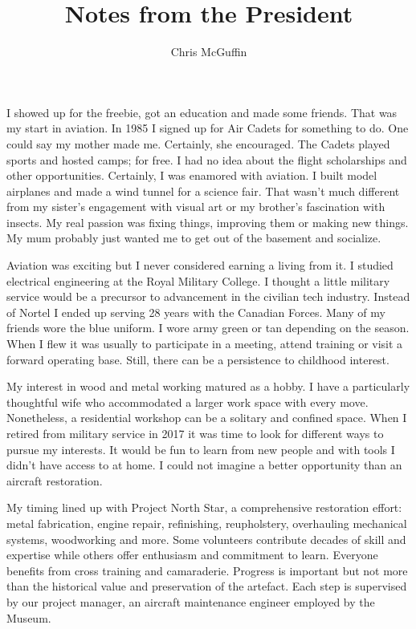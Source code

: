 
%


\title{Notes from the President}
\author{Chris McGuffin}

\maketitle

I showed up for the freebie, got an education and made some friends. That was my start in aviation. In 1985 I signed up for Air Cadets for something to do. One could say my mother made me. Certainly, she encouraged. The Cadets played sports and hosted camps; for free. I had no idea about the flight scholarships and other opportunities. Certainly, I was enamored with aviation. I built model airplanes and made a wind tunnel for a science fair. That wasn't much different from my sister's engagement with visual art or my brother's fascination with insects. My real passion was fixing things, improving them or making new things. My mum probably just wanted me to get out of the basement and socialize.

Aviation was exciting but I never considered earning a living from it. I studied electrical engineering at the Royal Military College. I thought a little military service would be a precursor to advancement in the civilian tech industry. Instead of Nortel I ended up serving 28 years with the Canadian Forces. Many of my friends wore the blue uniform. I wore army green or tan depending on the season. When I flew it was usually to participate in a meeting, attend training or visit a forward operating base. Still, there can be a persistence to childhood interest.

My interest in wood and metal working matured as a hobby. I have a particularly thoughtful wife who accommodated a larger work space with every move. Nonetheless, a residential workshop can be a solitary and confined space. When I retired from military service in 2017 it was time to look for different ways to pursue my interests. It would be fun to learn from new people and with tools I didn't have access to at home. I could not imagine a better opportunity than an aircraft restoration. 

My timing lined up with Project North Star, a comprehensive restoration effort: metal fabrication, engine repair, refinishing, reupholstery, overhauling mechanical systems, woodworking and more. Some volunteers contribute decades of skill and expertise while others offer enthusiasm and commitment to learn. Everyone benefits from cross training and camaraderie. Progress is important but not more than the historical value and preservation of the artefact. Each step is supervised by our project manager, an aircraft maintenance engineer employed by the Museum. 

